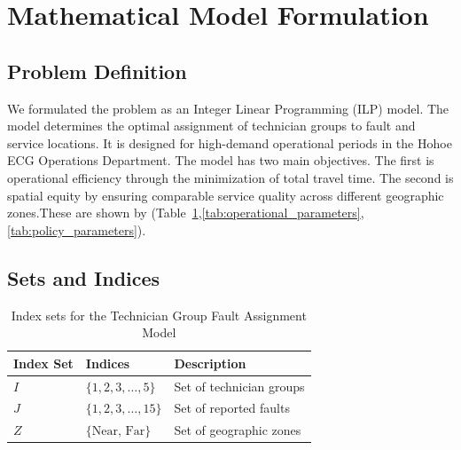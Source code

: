 \documentclass[11pt]{article}
\begin{document}
\section*{Mathematical Model Formulation}

\subsection*{Problem Definition}
We formulated the problem as an Integer Linear Programming (ILP) model. The model determines the optimal assignment of technician groups to fault and service locations. It is designed for high-demand operational periods in the Hohoe ECG Operations Department. The model has two main objectives. The first is operational efficiency through the minimization of total travel time. The second is spatial equity by ensuring comparable service quality across different geographic zones.These are shown by (Table~\ref{tab:index_sets},\ref{tab:operational_parameters},\ref{tab:policy_parameters}).


\subsection*{Sets and Indices}
\begin{table}[h!]
\centering
\caption{Index sets for the Technician Group Fault Assignment Model}
\label{tab:index_sets}
\begin{tabular}{l l l}
\toprule
\textbf{Index Set} & \textbf{Indices} & \textbf{Description} \\
\midrule
$I$ & $\{1, 2, 3, \dots, 5\}$ & Set of technician groups \\
$J$ & $\{1, 2, 3, \dots, 15\}$ & Set of reported faults \\
$Z$ & $\{\text{Near, Far}\}$ & Set of geographic zones \\
\bottomrule
\end{tabular}
\end{table}
\end{document}
